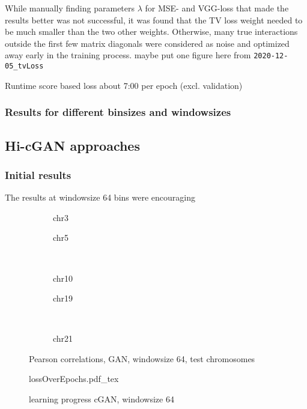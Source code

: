 While manually finding parameters $\lambda$ for MSE- and VGG-loss that made the results better was not successful,
it was found that the TV loss weight needed to be much smaller than the two other weights.
Otherwise, many true interactions outside the first few matrix diagonals were considered as noise and optimized away early in the training process.
\xxx maybe put one figure here from \texttt{2020-12-05\_tvLoss}

\xxx Runtime score based loss about 7:00 per epoch (excl. validation)


\subsubsection{Results for different binsizes and windowsizes}

\subsection{Hi-cGAN approaches} \label{sec:results:cgan}
\subsubsection{Initial results}
The results at windowsize 64 bins were encouraging \xxx
\begin{figure}[p]
    \begin{subfigure}{0.45\textwidth}
        \scriptsize
        \caption{chr3}
    \end{subfigure} \hfill
    \begin{subfigure}{0.45\textwidth}
        \scriptsize
        \caption{chr5}
    \end{subfigure}\\[5mm]
    \begin{subfigure}{0.45\textwidth}
        \scriptsize
        \caption{chr10}
    \end{subfigure}\hfill
    \begin{subfigure}{0.45\textwidth}
        \scriptsize
        \caption{chr19}
    \end{subfigure}\\[3mm]
    \centering
    \begin{subfigure}{0.45\textwidth}
        \scriptsize
        \caption{chr21}
    \end{subfigure}
    \caption{Pearson correlations, GAN, windowsize 64, test chromosomes}
    \label{fig:results:GAN64_pearson}
\end{figure}
\begin{figure}[hbp]
 \centering
 \scriptsize
 {lossOverEpochs.pdf_tex}
 \caption{learning progress cGAN, windowsize 64} \label{fig:results:GAN64_lossEpochs}
\end{figure}

